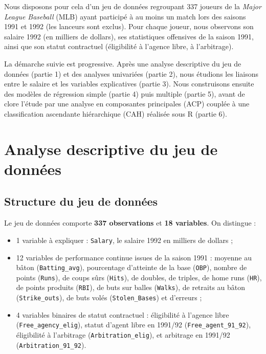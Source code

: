 \documentclass[11pt,a4paper]{article}
\begin{document}
Nous disposons pour cela d'un jeu de données regroupant 337 joueurs de la
\textit{Major League Baseball} (MLB) ayant participé à au moins un match lors des
saisons 1991 et 1992 (les lanceurs sont exclus). Pour chaque joueur, nous observons
son salaire 1992 (en milliers de dollars), ses statistiques offensives de la saison 1991,
ainsi que son statut contractuel (éligibilité à l'agence libre, à l'arbitrage).\vspace{0.3cm}

La démarche suivie est progressive. Après une analyse descriptive du jeu de données
(partie 1) et des analyses univariées (partie 2), nous étudions les liaisons entre le
salaire et les variables explicatives (partie 3). Nous construisons ensuite des modèles
de régression simple (partie 4) puis multiple (partie 5), avant de clore l'étude par
une analyse en composantes principales (ACP) couplée à une classification ascendante
hiérarchique (CAH) réalisée sous R (partie 6).

\section{Analyse descriptive du jeu de données}

\subsection{Structure du jeu de données}

Le jeu de données comporte \textbf{337 observations} et \textbf{18 variables}. On
distingue :
\begin{itemize}
  \item 1 variable à expliquer : \texttt{Salary}, le salaire 1992 en milliers de dollars ;\vspace{0.3cm}
  \item 12 variables de performance continue issues de la saison 1991 :
        moyenne au bâton (\texttt{Batting\_avg}), pourcentage d'atteinte de la base
        (\texttt{OBP}), nombre de points (\texttt{Runs}), de coups sûrs (\texttt{Hits}),
        de doubles, de triples, de home runs (\texttt{HR}), de points produits
        (\texttt{RBI}), de buts sur balles (\texttt{Walks}), de retraits au bâton
        (\texttt{Strike\_outs}), de buts volés (\texttt{Stolen\_Bases}) et d'erreurs ;\vspace{0.3cm}
  \item 4 variables binaires de statut contractuel : éligibilité à l'agence libre
        (\texttt{Free\_agency\_elig}), statut d'agent libre en 1991/92
        (\texttt{Free\_agent\_91\_92}), éligibilité à l'arbitrage
        (\texttt{Arbitration\_elig}), et arbitrage en 1991/92
        (\texttt{Arbitration\_91\_92}).
\end{itemize}
\end{document}
